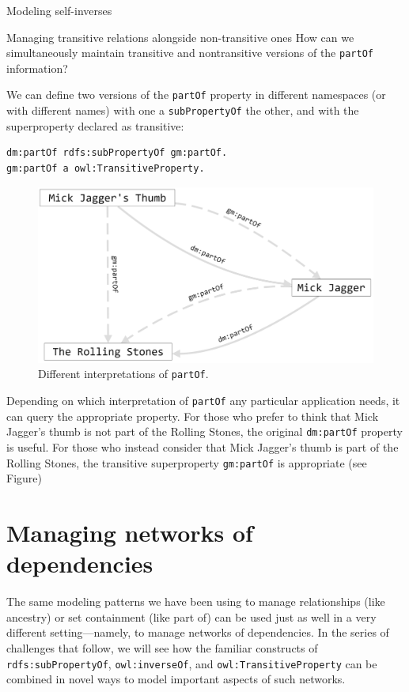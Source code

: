 \begin{challenge}{Modeling self-inverses}
\begin{challenge}{Managing transitive relations alongside non-transitive ones}
\label{chal:18}
How can we simultaneously maintain transitive and nontransitive versions
of the \texttt{partOf} information?

\solution

We can define two versions of the \texttt{partOf} property in different
namespaces (or with different names) with one a \texttt{subPropertyOf} the other,
and with the superproperty declared as transitive:

\begin{lstlisting}
dm:partOf rdfs:subPropertyOf gm:partOf.
gm:partOf a owl:TransitiveProperty.
\end{lstlisting}


\begin{figure}
\centering
\includegraphics[width=5in]{SWWOv3/media/ch9/figure9-5.png}
\caption{Different interpretations of \texttt{partOf}.}
\label{fig:ch8.5}
\end{figure}



Depending on which interpretation of \texttt{partOf} any particular application
needs, it can query the appropriate property. For those who prefer to
think that Mick Jagger's thumb is not part of the Rolling Stones, the
original \texttt{dm:partOf} property is useful. For those who instead consider
that Mick Jagger's thumb is part of the Rolling Stones, the transitive
superproperty \texttt{gm:partOf} is appropriate (see Figure\label{fig:ch8.5})
\end{challenge}

\section{Managing networks of dependencies}

The same modeling patterns we have been using to manage relationships
(like ancestry) or set containment (like part of) can be used just as
well in a very different setting---namely, to manage networks of
dependencies. In the series of challenges that follow, we will see how
the familiar constructs of \texttt{rdfs:subPropertyOf}, \texttt{owl:inverseOf}, and
\texttt{owl:TransitiveProperty} can be combined in novel ways to model important
aspects of such networks.


\end{challenge}
